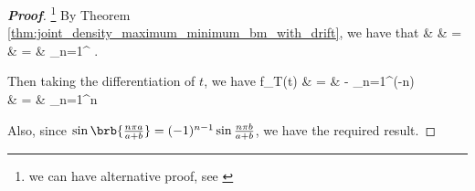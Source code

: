 \begin{proof}[\bf Proof]\footnote{we can have alternative proof, see \cite{Douady_1999}}
By Theorem \ref{thm:joint_density_maximum_minimum_bm_with_drift}, we have that
\beast
& & \pro{} = \pro{}\\
& = & \exp{} \sum_{n=1}^\infty  {} \exp {} .
\eeast

Then taking the differentiation of $t$, we have
\beast
f_T(t) & = & -\exp{} \sum_{n=1}^\infty  (-n) \exp {} \\
& = & \exp{} \sum_{n=1}^\infty n \exp {} 
\eeast

Also, since $\sin\brb{\frac{n\pi a}{a+b}} = (-1)^{n-1} \sin\frac{n\pi  b}{a+b}$, we have the required result.
\end{proof}

